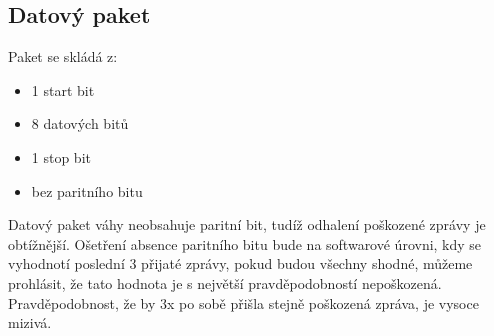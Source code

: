 \subsection{Datový paket}

Paket se skládá z:
\begin{itemize}
    \item 1 start bit
    \item 8 datových bitů
    \item 1 stop bit
    \item bez paritního bitu
\end{itemize}


Datový paket váhy neobsahuje paritní bit, tudíž odhalení poškozené zprávy je obtížnější. Ošetření absence paritního bitu bude na softwarové úrovni, kdy se vyhodnotí poslední 3 přijaté zprávy, pokud budou všechny shodné, můžeme prohlásit, že tato hodnota je s největší pravděpodobností nepoškozená. Pravděpodobnost, že by 3x po sobě přišla stejně poškozená zpráva, je vysoce mizivá.







